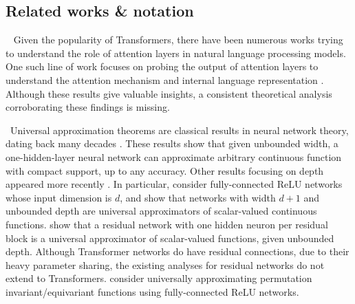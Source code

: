\vspace*{-5pt}
\subsection{Related works \& notation}
\vspace*{-3pt}
~%
Given the popularity of Transformers, there have been numerous works trying to understand the role of attention layers in natural language processing models. One such line of work focuses on probing the output of attention layers to understand the attention mechanism and internal language representation \citep{hewitt2019structural, clark2019does, coenen2019visualizing, vig2019analyzing}. Although these results give valuable insights, a consistent theoretical analysis corroborating these findings is missing. %

~Universal approximation theorems are classical results in neural network theory, dating back many decades \citep{cybenko1989approximation, hornik1991approximation}. These results show that given unbounded width, a one-hidden-layer neural network can approximate arbitrary continuous function with compact support, up to any accuracy. 
Other results focusing on depth appeared more recently \citep{lu2017expressive, hanin2017approximating, lin2018resnet}. In particular, \citet{lu2017expressive, hanin2017approximating} consider fully-connected ReLU networks whose input dimension is $d$, and show that networks with width $d+1$ and unbounded depth are universal approximators of scalar-valued continuous functions. \citet{lin2018resnet} show that a residual network with one hidden neuron per residual block is a universal approximator of scalar-valued functions, given unbounded depth.
Although Transformer networks do have residual connections, due to their heavy parameter sharing, the existing analyses for residual networks do not extend to Transformers.
\citet{sannai2019universal} consider universally approximating permutation invariant/equivariant functions using fully-connected ReLU networks.

